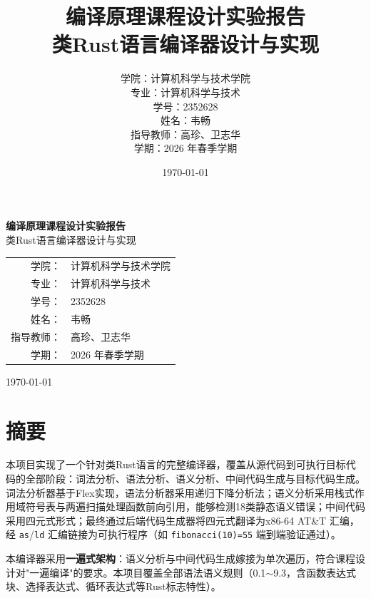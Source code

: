 \documentclass[12pt,a4paper]{ctexart}
\title{\textbf{编译原理课程设计实验报告}\\[0.5em]
\large 类Rust语言编译器设计与实现}
\author{
    \begin{tabular}{rl}
        学院：& 计算机科学与技术学院 \\
        专业：& 计算机科学与技术 \\
        学号：& 2352628 \\
        姓名：& 韦畅 \\
        指导教师：& 高珍、卫志华 \\
        学期：& 2026 年春季学期
    \end{tabular}
}
\date{\today}
\begin{document}
\begin{titlepage}
\centering
\vspace*{\fill}

{\LARGE\textbf{编译原理课程设计实验报告}\\[1em]
\large 类Rust语言编译器设计与实现}

\vspace{3em}

{\renewcommand{\arraystretch}{1.8}
\begin{tabular}{rl}
    学院：& 计算机科学与技术学院 \\
    专业：& 计算机科学与技术 \\
    学号：& 2352628 \\
    姓名：& 韦畅 \\
    指导教师：& 高珍、卫志华 \\
    学期：& 2026 年春季学期
\end{tabular}}

\vspace{2em}
{\today}

\vspace*{\fill}
\end{titlepage}

\tableofcontents
\newpage

\section*{摘要}

本项目实现了一个针对类Rust语言的完整编译器，覆盖从源代码到可执行目标代码的全部阶段：词法分析、语法分析、语义分析、中间代码生成与目标代码生成。词法分析器基于Flex实现，语法分析器采用递归下降分析法；语义分析采用栈式作用域符号表与两遍扫描处理函数前向引用，能够检测18类静态语义错误；中间代码采用四元式形式；最终通过后端代码生成器将四元式翻译为x86-64 AT\&T 汇编，经 \texttt{as}/\texttt{ld} 汇编链接为可执行程序（如 \texttt{fibonacci(10)=55} 端到端验证通过）。

本编译器采用\textbf{一遍式架构}：语义分析与中间代码生成嫁接为单次遍历，符合课程设计对"一遍编译"的要求。本项目覆盖全部语法语义规则（0.1\(\sim\)9.3，含函数表达式块、选择表达式、循环表达式等Rust标志特性）。
\end{document}
